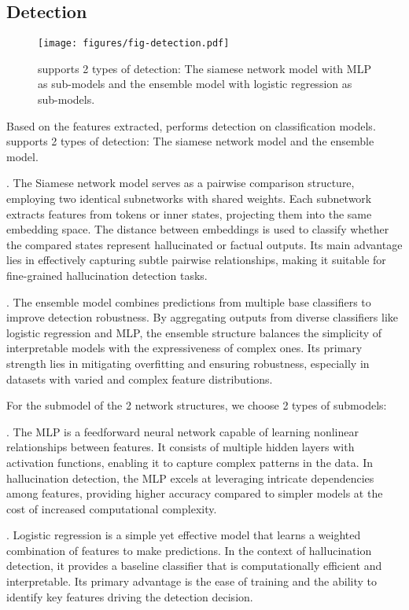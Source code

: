 \subsection{Detection}\label{sec:scheme:detect}

\begin{figure}[htbp]
    \centering
    \texttt{[image: figures/fig-detection.pdf]}
    \caption{
    \sysname supports 2 types of detection: The siamese network model with MLP as sub-models and the ensemble model with logistic regression as sub-models.
    }
    \label{fig:detection}
\end{figure}

Based on the features extracted, \sysname performs detection on classification models.
\sysname supports 2 types of detection: The siamese network model and the ensemble model.

.
The Siamese network model serves as a pairwise comparison structure, employing two identical subnetworks with shared weights. Each subnetwork extracts features from tokens or inner states, projecting them into the same embedding space. The distance between embeddings is used to classify whether the compared states represent hallucinated or factual outputs. Its main advantage lies in effectively capturing subtle pairwise relationships, making it suitable for fine-grained hallucination detection tasks.

.
The ensemble model combines predictions from multiple base classifiers to improve detection robustness. By aggregating outputs from diverse classifiers like logistic regression and MLP, the ensemble structure balances the simplicity of interpretable models with the expressiveness of complex ones. Its primary strength lies in mitigating overfitting and ensuring robustness, especially in datasets with varied and complex feature distributions.

For the submodel of the 2 network structures, we choose 2 types of submodels:

.
The MLP is a feedforward neural network capable of learning nonlinear relationships between features. It consists of multiple hidden layers with activation functions, enabling it to capture complex patterns in the data. In hallucination detection, the MLP excels at leveraging intricate dependencies among features, providing higher accuracy compared to simpler models at the cost of increased computational complexity.

.
Logistic regression is a simple yet effective model that learns a weighted combination of features to make predictions. In the context of hallucination detection, it provides a baseline classifier that is computationally efficient and interpretable. Its primary advantage is the ease of training and the ability to identify key features driving the detection decision.

